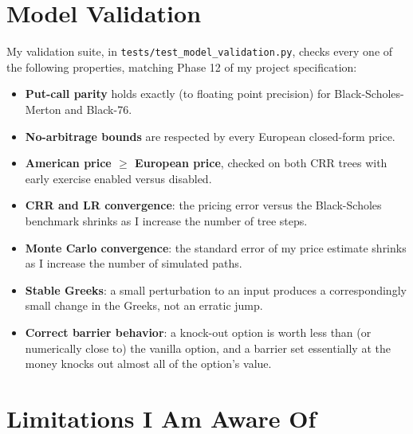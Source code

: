 \documentclass[12pt,a4paper]{article}
\begin{document}
\section{Model Validation}

My validation suite, in \texttt{tests/test\_model\_validation.py}, checks
every one of the following properties, matching Phase 12 of my project
specification:

\begin{itemize}[noitemsep]
    \item \textbf{Put-call parity} holds exactly (to floating point precision) for Black-Scholes-Merton and Black-76.
    \item \textbf{No-arbitrage bounds} are respected by every European closed-form price.
    \item \textbf{American price $\ge$ European price}, checked on both CRR trees with early exercise enabled versus disabled.
    \item \textbf{CRR and LR convergence}: the pricing error versus the Black-Scholes benchmark shrinks as I increase the number of tree steps.
    \item \textbf{Monte Carlo convergence}: the standard error of my price estimate shrinks as I increase the number of simulated paths.
    \item \textbf{Stable Greeks}: a small perturbation to an input produces a correspondingly small change in the Greeks, not an erratic jump.
    \item \textbf{Correct barrier behavior}: a knock-out option is worth less than (or numerically close to) the vanilla option, and a barrier set essentially at the money knocks out almost all of the option's value.
\end{itemize}

\section{Limitations I Am Aware Of}
\end{document}
